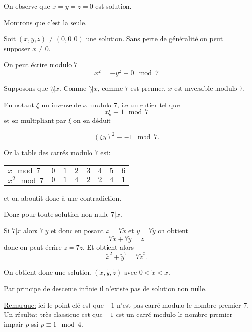 \begin{sol}
  On observe que $x=y=z=0$ est solution.

  Montrons que c'est la seule.


  Soit $(x,y,z) \neq (0,0,0)$ une solution. Sans perte de généralité on peut supposer $x \neq 0$.




  On peut écrire modulo $7$
  $$x^2 = - y^2 \equiv 0 \mod 7$$


  Supposons que $7 \not| x$.
  Comme $7 \not| x$, comme $7$ est premier, $x$ est inversible modulo $7$.

  En notant $\xi$ un inverse de $x$ modulo $7$, i.e un entier tel que
  $$x \xi \equiv 1 \mod 7$$
  et en multipliant par $\xi$ on en déduit

  $$(\xi y)^2 \equiv -1 \mod 7.$$


  Or la table des carrés modulo $7$ est:


  \begin{center}
    \begin{tabular}{|l|c|c|c|c|c|c|c|}
      \hline
      $x \mod 7$   & $0$ & $1$ & $2$ & $3$ & $4$ & $5$ & $6$ \\
      \hline
      $x^2 \mod 7$ & $0$ & $1$ & $4$ & $2$ & $2$ & $4$ & $1$ \\
      \hline
    \end{tabular}
  \end{center}
  et on aboutit donc à une contradiction.


  Donc pour toute solution non nulle $7 | x$.

  Si $7 | x$ alors $7 | y$ et donc en posant $x = 7 \tilde{x}$ et $y= 7 \tilde{y}$ on obtient
  $$7 \tilde{x} + 7 \tilde{y} =  z$$
  donc on peut écrire $z = 7 \tilde{z}$. Et obtient alors
  $$\tilde{x}^2 + \tilde{y}^2 = 7 \tilde{z}^2.$$

  On obtient donc une solution $(\tilde{x},\tilde{y},\tilde{z})$ avec $0 < \tilde{x} < x$.

  Par principe de descente infinie il n'existe pas de solution non nulle.

  \underline{Remarque:} ici le point clé est que $-1$ n'est pas carré modulo le nombre premier $7$. Un résultat très classique est que $-1$ est un carré modulo le nombre premier impair $p$ ssi $p \equiv 1 \mod 4$.
\end{sol}
